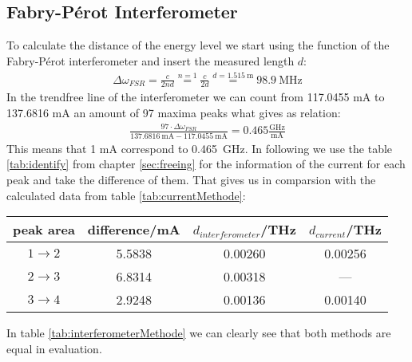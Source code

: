 \subsection*{Fabry-Pérot Interferometer}
To calculate the distance of the energy level we start using the function of the Fabry-Pérot interferometer and insert the measured length $d$:
\begin{gather}
    \Delta\omega_{FSR} = \frac{c}{2nd} \overset{n=1}{=} \frac{c}{2d} \overset{d=\SI{1.515}{\metre}}{=} \SI{98.9}{\mega\hertz} 
\end{gather}
In the trendfree line of the interferometer we can count from 117.0455 mA to 137.6816 mA an amount of 97 maxima peaks what gives as relation:
\begin{gather}
    \frac{97\cdot \Delta\omega_{FSR}}{\SI{137.6816}{\milli\ampere}-\SI{117.0455}{\milli\ampere}} = 0.465\frac{\si{\giga\hertz}}{\si{\milli\ampere}}
\end{gather}
This means that 1 mA correspond to \SI{0.465}{\giga\hertz}. In following we use the table \ref{tab:identify} from chapter \ref{sec:freeing} for the information of the current for each peak and take the difference of them. That gives us in comparsion with the calculated data from table \ref{tab:currentMethode}:
\begin{center}
    \begin{tabular}{c | c c c}
        peak area & difference/mA & $d_{interferometer}$/THz & $d_{current}$/THz\\
        \hline
        $1 \rightarrow 2$ & 5.5838 & 0.00260 & 0.00256\\
        $2 \rightarrow 3$ & 6.8314 & 0.00318 &   ---  \\
        $3 \rightarrow 4$ & 2.9248 & 0.00136 & 0.00140\\
    \end{tabular}
    \label{tab:interferometerMethode}
\end{center} 
In table \ref{tab:interferometerMethode} we can clearly see that both methods are equal in evaluation.
\newpage